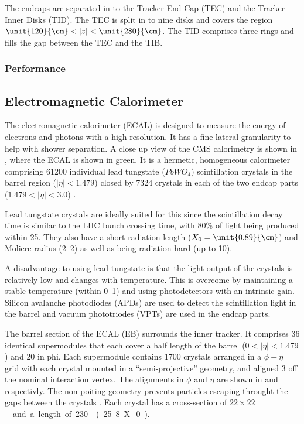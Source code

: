 The endcaps are separated in to the Tracker End Cap (TEC) and the Tracker Inner
Disks (TID). The TEC is split in to nine disks and covers the region
$\unit{120}{\cm} < |z| < \unit{280}{\cm}$. The TID comprises three rings
and fills the gap between the TEC and the TIB.

\subsubsection{Performance}

\subsection{Electromagnetic Calorimeter}
The electromagnetic calorimeter (ECAL) is designed to measure the energy of
electrons and photons with a high resolution.  It has a fine lateral granularity
to help with shower separation.  A close up view of the CMS calorimetry is shown
in , where the ECAL is shown in green.  It is a hermetic,
homogeneous calorimeter comprising 61200 individual lead tungstate ($PbWO_{4}$)
scintillation crystals in the barrel region ($|\eta|<1.479$) closed by 7324
crystals in each of the two endcap parts ($1.479<|\eta|<3.0$)
\cite{ecal1997technical}.

Lead tungstate crystals are ideally suited for this since the scintillation
decay time is similar to the LHC bunch crossing time, 
with \unit{80}{\%} of light being produced within \unit{25}{\ns}.
They also have a short radiation length ($X_0=\unit{0.89}{\cm}$) 
and Moliere radius (\unit{2.2}{\cm}) as well as being radiation hard
(up to \unit{10}{\mrad}).

A disadvantage to using lead tungstate is that the light output of the crystals
is relatively low and changes with temperature. This is overcome by maintaining
a stable temperature (within \unit{0.1}{\degreecelsius}) and using
photodetectors with an intrinsic gain.
Silicon avalanche photodiodes (APDs) are used to detect the scintillation light
in the barrel and vacuum phototriodes (VPTs) are used in the endcap parts.

The barrel section of the ECAL (EB) surrounds the inner tracker. It comprises 36
identical supermodules that each cover a half length of the barrel
($0<|\eta|<1.479$) and \unit{20}{\degree} in phi. Each supermodule contains 1700
crystals arranged in a $\phi - \eta$ grid with each crystal mounted in a
``semi-projective'' geometry, and aligned \unit{3}{\degree} off the nominal
interaction vertex.  The alignments in $\phi$ and $\eta$ are shown in
 and  respectivly. The
non-poiting geometry prevents particles escaping throught the gaps between the
crystals \cite{ecal1997technical}.  Each crystal has a cross-section of
\unit{$22 \times 22$}{\mm\squared} and a length of \unit{230}{\mm}
(\unit{25.8}{X_0}).

